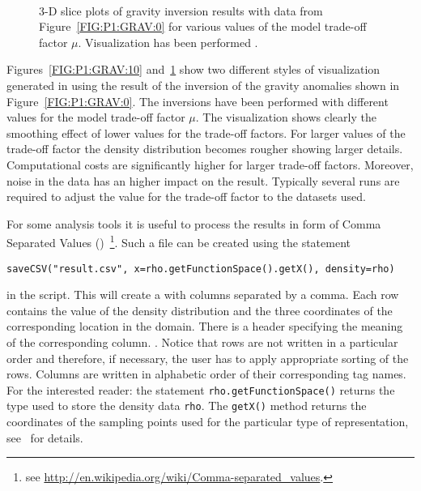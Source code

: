 \begin{figure}
    \begin{center}
        \\ %
    \end{center}
    \caption{3-D slice plots of gravity inversion results with data from
    Figure~\ref{FIG:P1:GRAV:0} for various values of the model trade-off
    factor $\mu$. Visualization has been performed \VisIt.
    }
    \label{FIG:P1:GRAV:11}
\end{figure}

Figures~\ref{FIG:P1:GRAV:10} and~\ref{FIG:P1:GRAV:11} show two different
styles of visualization generated in \VisIt using the result of the inversion
of the gravity anomalies shown in Figure~\ref{FIG:P1:GRAV:0}.
The inversions have been performed with different values for the model
trade-off factor $\mu$.
The visualization shows clearly the smoothing effect of lower values for the
trade-off factors.
For larger values of the trade-off factor the density distribution becomes
rougher showing larger details.
Computational costs are significantly higher for larger trade-off factors.
Moreover, noise in the data has an higher impact on the result.
Typically several runs are required to adjust the value for the trade-off
factor to the datasets used.

For some analysis tools it is useful to process the results in form of Comma
Separated Values (\CSV)~\footnote{see 
\url{http://en.wikipedia.org/wiki/Comma-separated_values}.}.
Such a file can be created using the statement
\begin{verbatim}
saveCSV("result.csv", x=rho.getFunctionSpace().getX(), density=rho)
\end{verbatim}
in the script.
This will create a  with columns separated by a comma.
Each row contains the value of the density distribution and the three
coordinates of the corresponding location in the domain.
There is a header specifying the meaning of the corresponding column.
.
Notice that rows are not written in a particular order and therefore, if
necessary, the user has to apply appropriate sorting of the rows.
Columns are written in alphabetic order of their corresponding tag names.
For the interested reader: the statement \verb|rho.getFunctionSpace()| returns
the type used to store the density data \verb|rho|.
The \verb|getX()| method returns the coordinates of the sampling points used
for the particular type of representation, see~\cite{ESCRIPT} for details. 


